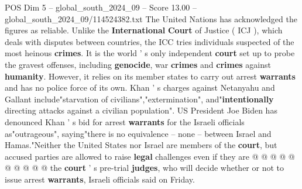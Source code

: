 \begin{textsample}{POS Dim 5 – global\_south\_2024\_09 – Score 13.00 – global\_south\_2024\_09/114524382.txt}
The United Nations has acknowledged the figures as reliable.
Unlike the \textbf{International} \textbf{Court} of Justice ( ICJ ), which deals with disputes between countries, the ICC tries individuals suspected of the most heinous \textbf{crimes}.
It is the world ' s only independent \textbf{court} set up to probe the gravest offenses, including \textbf{genocide}, war \textbf{crimes} and \textbf{crimes} against \textbf{humanity}.
However, it relies on its member states to carry out arrest \textbf{warrants} and has no police force of its own.
Khan ' s charges against Netanyahu and Gallant include"starvation of civilians","extermination", and"\textbf{intentionally} directing attacks against a civilian population".
US President Joe Biden has denounced Khan ' s bid for arrest \textbf{warrants} for the Israeli officials as"outrageous", saying"there is no equivalence -- none -- between Israel and Hamas."Neither the United States nor Israel are members of the \textbf{court}, but accused parties are allowed to raise \textbf{legal} challenges even if they are @ @ @ @ @ @ @ @ @ @ the \textbf{court} ' s pre-trial \textbf{judges}, who will decide whether or not to issue arrest \textbf{warrants}, Israeli officials said on Friday.

\end{textsample}
